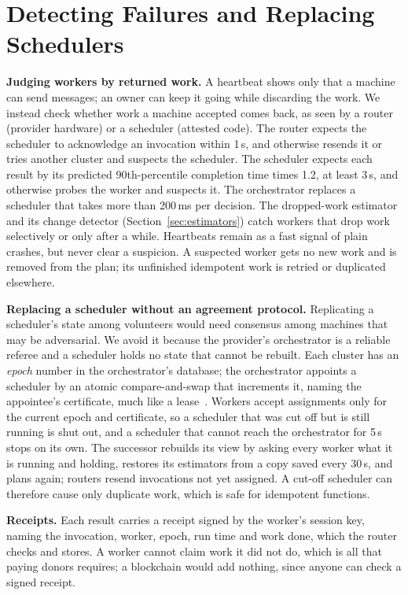 \section{Detecting Failures and Replacing Schedulers}
\label{sec:ft}
\label{sec:succession}
\label{sec:receipts}

\textbf{Judging workers by returned work.} A heartbeat shows only that a machine can send messages; an owner can keep it
going while discarding the work. We instead check whether work a machine accepted comes back, as seen by a router (provider
hardware) or a scheduler (attested code). The router expects the scheduler to acknowledge an invocation within 1\,s, and
otherwise resends it or tries another cluster and suspects the scheduler. The scheduler expects each result by its predicted
90th-percentile completion time times 1.2, at least 3\,s, and otherwise probes the worker and suspects it. The orchestrator
replaces a scheduler that takes more than 200\,ms per decision. The dropped-work estimator and its change detector
(Section~\ref{sec:estimators}) catch workers that drop work selectively or only after a while. Heartbeats remain as a fast
signal of plain crashes, but never clear a suspicion. A suspected worker gets no new work and is removed from the plan; its
unfinished idempotent work is retried or duplicated elsewhere.

\textbf{Replacing a scheduler without an agreement protocol.} Replicating a scheduler's state among volunteers would need
consensus among machines that may be adversarial. We avoid it because the provider's orchestrator is a reliable referee and
a scheduler holds no state that cannot be rebuilt. Each cluster has an \emph{epoch} number in the orchestrator's database;
the orchestrator appoints a scheduler by an atomic compare-and-swap that increments it, naming the appointee's certificate,
much like a lease~\cite{burrows2006chubby}. Workers accept assignments only for the current epoch and certificate, so a
scheduler that was cut off but is still running is shut out, and a scheduler that cannot reach the orchestrator for 5\,s
stops on its own. The successor rebuilds its view by asking every worker what it is running and holding, restores its
estimators from a copy saved every 30\,s, and plans again; routers resend invocations not yet assigned. A cut-off scheduler
can therefore cause only duplicate work, which is safe for idempotent functions.

\textbf{Receipts.} Each result carries a receipt signed by the worker's session key, naming the invocation, worker, epoch,
run time and work done, which the router checks and stores. A worker cannot claim work it did not do, which is all that
paying donors requires; a blockchain would add nothing, since anyone can check a signed receipt.
